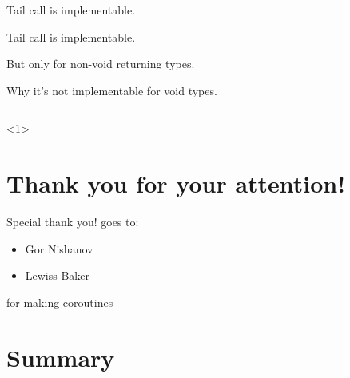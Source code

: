 \documentclass[10pt]{beamer}
\def \coroCpp {coroLexer.py -x}
\begin{document}
\begin{frame}{Tail call is implementable.}

\centerline{Tail call is implementable.}

\alert{But only for non-void returning types.}

\end{frame}

\begin{frame}{Why it's not implementable for void types.}

\inputminted{\coroCpp}{code-examples/retval-retvoid/void-example.cpp}


<1>

\pause
\pause


\end{frame}

\section*{Thank you for your attention!}

\begin{frame}{Special thank you! goes to:}
	\begin{itemize}
		\item Gor Nishanov
		\item Lewiss Baker	
	\end{itemize}

	for making coroutines 
\end{frame}

\section{Summary}
\end{document}
